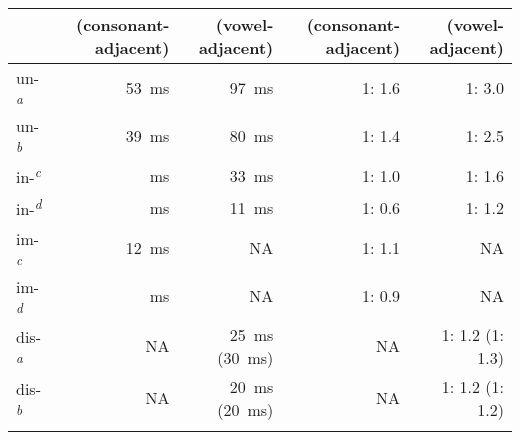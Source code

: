 \begin{table}
{\begin{tabular} {lrrrr}
				&(consonant-adjacent) &(vowel-adjacent)& (consonant-adjacent) &(vowel-adjacent)\\
				\midrule			
				{un-}\textsuperscript{\textit{a}}& 53~ms & 97~ms   &  1: 1.6&1: 3.0\\ 
				{un-}\textsuperscript{\itshape b}& 39~ms & 80~ms   & 1: 1.4&1: 2.5\\ 
				{in-}\textsuperscript{\itshape c}&\textminus1~ms &33~ms&1: 1.0&1: 1.6\\ 
				{in-}\textsuperscript{\itshape d}&\textminus41~ms &11~ms&  1: 0.6& 1: 1.2\\ 
				{im-}\textsuperscript{\itshape c}&12~ms &NA  &  1: 1.1&NA \\ 
				{im-}\textsuperscript{\itshape d}&\textminus10~ms &NA  & 1: 0.9 & NA\\ 
				{dis-}\textsuperscript{\textit{a}}&NA & 25~ms  (30~ms)&NA &1: 1.2 (1: 1.3)   \\
				{dis-}\textsuperscript{\itshape b}&NA & 20~ms  (20~ms)& NA& 1: 1.2 (1: 1.2) \\
			\lspbottomrule 
			\end{tabular}}
\end{table}
